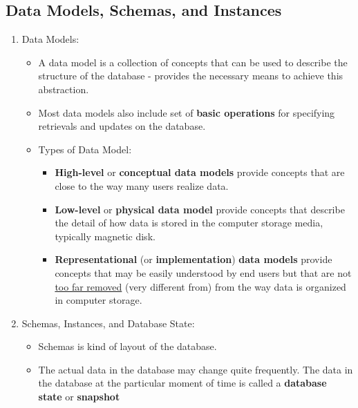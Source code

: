 \documentclass[10pt]{article}
\begin{document}
\subsection{Data Models, Schemas, and Instances}
\begin{enumerate}
	\item Data Models:
	\begin{itemize}
		\item A data model is a collection of concepts that can be used to describe the structure of the database - provides the necessary means to achieve this abstraction.
		\item Most data models also include set of \textbf{basic operations} for specifying retrievals and updates on the database.
		\item Types of Data Model:
		\begin{itemize}
			\item \textbf{High-level} or \textbf{conceptual data models} provide concepts that are close to the way many users realize data.
			\item \textbf{Low-level} or \textbf{physical data model} provide concepts that describe the detail of how data is stored in the computer storage media, typically magnetic disk.
			\item \textbf{Representational} (or \textbf{implementation}) \textbf{data models} provide concepts that may be easily understood by end users but that are not \underline{too far removed} (very different from) from the way data is organized in computer storage.
		\end{itemize}
	\end{itemize}

	\item Schemas, Instances, and Database State:
	\begin{itemize}
		\item Schemas is kind of layout of the database.
		\item The actual data in the database may change quite frequently. The data in the database at the particular moment of time is called a \textbf{database state} or \textbf{snapshot}
	\end{itemize}
\end{enumerate}
\end{document}
